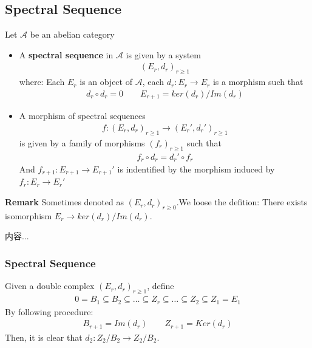 \documentclass[Total.tex]{subfiles}
\begin{document}
			\subsection{Spectral Sequence}
			\begin{Def}
				Let $\mathcal{A}$ be an abelian category
				\begin{itemize}
					\item A \textbf{spectral sequence} in $\mathcal{A}$ is given by a system
					\begin{gather*}
						(E_r,d_r)_{r\geq 1}
					\end{gather*}
					where: Each $E_r$ is an object of $\mathcal{A}$, each $d_r:E_r\rightarrow E_r$ is a morphism such that
					\begin{gather*}
						d_r\circ d_r=0\qquad E_{r+1}=ker(d_r)/Im(d_r)
					\end{gather*}
					\item A morphism of spectral sequences
					\begin{gather*}
						f:(E_r,d_r)_{r\geq 1}\rightarrow (E_r',d_r')_{r\geq 1}
					\end{gather*}
					is given by a family of morphisms $(f_r)_{r\geq 1}$ such that
					\begin{gather*}
						f_r\circ d_r=d_r'\circ f_r
					\end{gather*}
					And $f_{r+1}:E_{r+1}\rightarrow E_{r+1}'$ is indentified by the morphism induced by $f_r:E_r\rightarrow E_r'$
					\begin{center}
					\end{center}
				\end{itemize}
			\end{Def}
			\textbf{Remark} Sometimes denoted as $(E_r,d_r)_{r\geq 0}$.We loose the defition: There exists isomorphism $E_{r}\rightarrow ker(d_r)/Im(d_r)$.
			\begin{Def}
				内容...
			\end{Def}
			\subsubsection{Spectral Sequence}
				\begin{Def}
					Given a double complex $(E_r,d_r)_{r\geq 1}$, define
					\begin{gather*}
						0=B_1\subseteq B_2\subseteq \dots\subseteq Z_r\subseteq \dots\subseteq Z_2\subseteq Z_1=E_1
					\end{gather*}
					By following procedure:
					\begin{gather*}
						B_{r+1}=Im(d_r)\qquad Z_{r+1}=Ker(d_r)
					\end{gather*}
					Then, it is clear that $d_2:Z_2/B_2\rightarrow Z_2/B_2$. 
				\end{Def}
\end{document}
